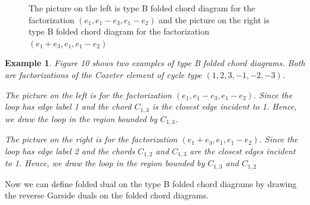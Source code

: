 \documentclass[11pt]{amsart}
\newtheorem{exa}[thm]{Example}%
\begin{document}
\begin{figure}
    \centering
    \caption{The picture on the left is type B folded chord diagram for the factorization $(e_1,e_1-e_3,e_1-e_2)$ and the picture on the right is type B folded chord diagram for the factorization $(e_1+e_3,e_1,e_1-e_2)$}
\end{figure}

\begin{exa}
    Figure 10 shows two examples of type B folded chord diagrams. Both are factorizations of the Coxeter element of cycle type $(1,2,3,-1,-2,-3)$. 

    The picture on the left is for the factorization $(e_1,e_1-e_3,e_1-e_2)$. Since the loop has edge label 1 and the chord $C_{1,3}$ is the closest edge incident to 1. Hence, we draw the loop in the region bounded by $C_{1,3}$.

    The picture on the right is for the factorization $(e_1+e_3,e_1,e_1-e_2)$. Since the loop has edge label 2 and the chords $C_{1,2}$ and $C_{1,3}$ are the closest edges incident to 1. Hence, we draw the loop in the region bounded by $C_{1,3}$ and $C_{1,2}$
\end{exa}

Now we can define folded dual on the type B folded chord diagrams by drawing the reverse Garside duals on the folded chord diagrams.
\end{document}
